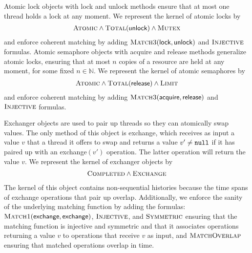\begin{example}

  Atomic lock objects with lock and unlock methods ensure that at
  most one thread holds a lock at any moment. We represent the kernel of atomic
  locks by
  \begin{align*}
    \textsc{Atomic} \land \textsc{Total}({\sf unlock}) \land \textsc{Mutex}
  \end{align*}
  and enforce coherent matching by adding $\textsc{Match3}({\sf lock, unlock})$
  and $\textsc{Injective}$ formulas. Atomic semaphore objects with acquire and
  release methods generalize atomic locks, ensuring that at most $n$ copies of
  a resource are held at any moment, for some fixed $n \in \mathbb{N}$. We
  represent the kernel of atomic semaphores by
  \begin{align*}
    \textsc{Atomic} \land \textsc{Total}({\sf release}) \land \textsc{Limit}
  \end{align*}
  and enforce coherent matching by adding $\textsc{Match3}({\sf acquire,
  release})$ and $\textsc{Injective}$ formulas.
  
  Exchanger objects are used to pair up threads so they can atomically swap
  values. The only method of this object is exchange, which receives as
  input a value $v$ that a thread it offers to swap and returns a value $v'\neq
  {\tt null}$ if it has paired up with an exchange$(v')$ operation. The latter
  operation will return the value $v$. We represent the kernel of exchanger
  objects by
  \begin{align*}
     \textsc{Completed} \land \textsc{Exchange}
  \end{align*}
  The kernel of this object contains non-sequential histories
  because the time spans of exchange
  operations that pair up overlap.
  Additionally, we enforce the sanity of the underlying matching function by
  adding the formulas: $\textsc{Match1}({\sf exchange},{\sf
  exchange})$, $\textsc{Injective}$, and $\textsc{Symmetric}$
  ensuring that the matching function is injective and symmetric and that it
  associates operations returning a value $v$ to operations that receive $v$
  as input, and $\textsc{MatchOverlap}$ ensuring that matched operations
  overlap in time.
  
\end{example}

